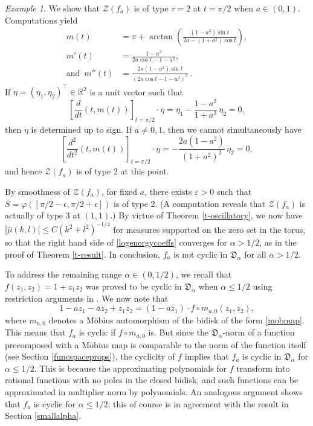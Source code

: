 \documentclass[11 pt,reqno]{amsart}
\theoremstyle{definition}
\theoremstyle{remark}
\newtheorem{ex}{Example}
\numberwithin{equation}{section} \numberwithin{figure}{section}
\begin{document}
\begin{ex}
We show that $\mathcal{Z}(f_a)$ is of type $\tau=2$ at $ t=\pi/2$ when $a\in (0,1)$.
Computations yield
\begin{align*}
m(  t) &= \pi+\arctan\left(\frac{(1-a^2)\sin  t}{2a-(1+a^2)\cos  t}\right), \\
m'(  t) &= \frac{1-a^2}{2a \cos  t -1-a^2},\\
\textrm{and} \,\,\, m''(  t) &= \frac{2a(1-a^2)\sin  t}{(2a \cos  t -1-a^2)^2}\,.
\end{align*}
If  $\eta = (\eta_1,\eta_2)^\top\in \mathbb{R}^2$ is a unit vector such that
\[\left[\frac{d}{dt}(t,m(t))\right]_{t=\pi/2} \cdot \eta= \eta_1  -\frac{1-a^2}{1+a^2}\,\eta_2 = 0, \]
then $\eta$ is determined up to sign. If $a\neq 0,1$, then we cannot simultaneously have
\[\left[\frac{d^2}{dt^2}(t,m(t))\right]_{t=\pi/2} \cdot \eta= -\frac{2a(1-a^2)}{(1+a^2)^2} \,\eta_2 =0,\]
and hence $\mathcal{Z}(f_a)$ is of type $2$ at this point.

By smoothness of $\mathcal{Z}(f_a)$, for fixed $a$, there exists
$\varepsilon>0$ such that $S={\varphi}([\pi/2-\epsilon, \pi/2+\epsilon])$
is of type $2$. (A computation reveals that $\mathcal{Z}(f_a)$ is
actually of type $3$ at $(1,1)$.)  By virtue of Theorem
\ref{t-oscillatory}, we now have $|\hat{\mu}(k,l)|\le C
(k^2+l^2)^{-1/4}$ for measures supported on the zero set in the torus,
so that the right hand side of \eqref{logenergycoeffs} converges for
$\alpha>1/2$, as in the proof of Theorem \ref{t-result}.  In
conclusion, $f_a$ is not cyclic in $\mathfrak{D}_\alpha$ for all
$\alpha>1/2$.

To address the remaining range $\alpha\in (0,1/2)$, we recall that $f(z_1,z_2)=1+z_1z_2$ was proved to be cyclic in $\mathfrak{D}_{\alpha}$ when $\alpha\leq 1/2$ using restriction arguments in \cite{BCLSS13II}. We now
note that
\[1-az_1-\bar{a} z_2+z_1z_2=(1-az_1)\cdot f\circ m_{a,0} (z_1,z_2),\]
where $m_{a,0}$ denotes a M\"obius automorphism of the bidisk of the
form \eqref{mobmap}. This means that $f_a$ is cyclic if $f\circ
m_{a,0}$ is. But since the $\mathfrak{D}_{\alpha}$-norm of a function
precomposed with a M\"obius map is comparable to the norm of the
function itself (see Section \ref{funcspaceprops}), the cyclicity of $f$ implies that $f_a$ is cyclic in $\mathfrak{D}_{\alpha}$ for $\alpha\leq 1/2$. This is because the approximating polynomials for $f$ transform into rational functions with no poles in the closed bidisk, and such functions can be approximated in multiplier norm by polynomials. An analogous argument shows that $f_a$ is cyclic for $\alpha\leq 1/2$; this of course is in agreement with the result in Section \ref{smallalpha}.


\end{ex}
\end{document}
